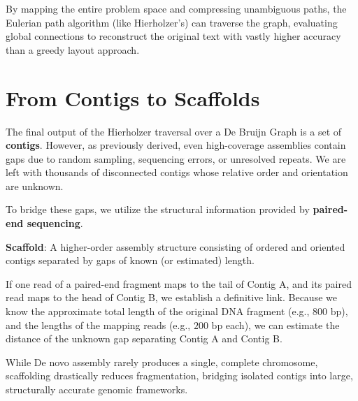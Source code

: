 By mapping the entire problem space and compressing unambiguous paths, the Eulerian path algorithm (like Hierholzer's) can traverse the graph, evaluating global connections to reconstruct the original text with vastly higher accuracy than a greedy layout approach.

\section{From Contigs to Scaffolds}
The final output of the Hierholzer traversal over a De Bruijn Graph is a set of \textbf{contigs}. However, as previously derived, even high-coverage assemblies contain gaps due to random sampling, sequencing errors, or unresolved repeats. We are left with thousands of disconnected contigs whose relative order and orientation are unknown.

To bridge these gaps, we utilize the structural information provided by \textbf{paired-end sequencing}.

\begin{important}
    \textbf{Scaffold}: A higher-order assembly structure consisting of ordered and oriented contigs separated by gaps of known (or estimated) length.
\end{important}

If one read of a paired-end fragment maps to the tail of Contig A, and its paired read maps to the head of Contig B, we establish a definitive link. Because we know the approximate total length of the original DNA fragment (e.g., $800 \text{ bp}$), and the lengths of the mapping reads (e.g., $200 \text{ bp}$ each), we can estimate the distance of the unknown gap separating Contig A and Contig B. 

\sta While De novo assembly rarely produces a single, complete chromosome, scaffolding drastically reduces fragmentation, bridging isolated contigs into large, structurally accurate genomic frameworks.

